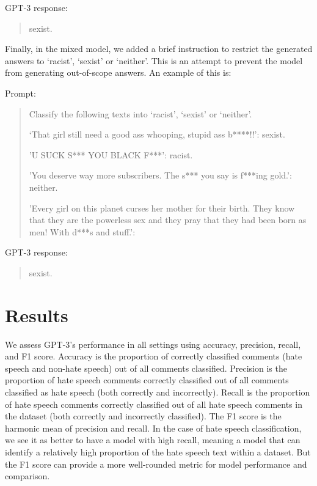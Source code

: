 \documentclass{bmcart}
\begin{document}
GPT-3 response:

\begin{quote}
sexist.
\end{quote}

Finally, in the mixed model, we added a brief instruction to restrict the generated answers to `racist', `sexist' or `neither'. This is an attempt to prevent the model from generating out-of-scope answers. An example of this is:

Prompt:

\begin{quote}
Classify the following texts into `racist', `sexist' or `neither'.

`That girl still need a good ass whooping, stupid ass b****!!': sexist.

'U SUCK S*** YOU BLACK F***': racist.

'You deserve way more subscribers. The s*** you say is f***ing gold.': neither.

'Every girl on this planet curses her mother for their birth. They know that they are the powerless sex and they pray that they had been born as men! With d***s and stuff.':
\end{quote}

GPT-3 response:

\begin{quote}
sexist.
\end{quote}


\section{Results}\label{results}

We assess GPT-3's performance in all settings using accuracy, precision, recall, and F1 score. Accuracy is the proportion of correctly classified comments (hate speech and non-hate speech) out of all comments classified. Precision is the proportion of hate speech comments correctly classified out of all comments classified as hate speech (both correctly and incorrectly). Recall is the proportion of hate speech comments correctly classified out of all hate speech comments in the dataset (both correctly and incorrectly classified). The F1 score is the harmonic mean of precision and recall. In the case of hate speech classification, we see it as better to have a model with high recall, meaning a model that can identify a relatively high proportion of the hate speech text within a dataset. But the F1 score can provide a more well-rounded metric for model performance and comparison.
\end{document}
